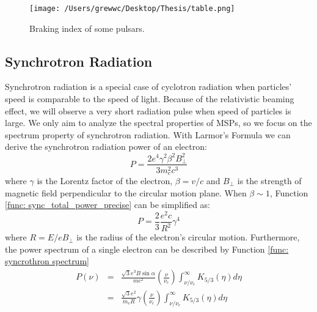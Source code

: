 \documentclass[12pt]{report}
\newcommand{\mycaption}[1]{\protect \caption{#1}}
\begin{document}
            
            \begin{figure}[!ht]
              \centering
              \texttt{[image: /Users/grewwc/Desktop/Thesis/table.png]}
              \mycaption{Braking index of some pulsars.}
              \label{fig:braking_index}
            \end{figure}
    
          \subsection{Synchrotron Radiation}
            Synchrotron radiation is a special case of cyclotron radiation when particles' speed is comparable to the 
            speed of light. Because of the relativistic beaming effect, we will observe a very short radiation pulse 
            when speed of particles is large. 
            We only aim to analyze the spectral properties of MSPs, so we focus on the 
            spectrum property of synchrotron radiation. 
            With Larmor's Formula we can derive the synchrotron radiation power of an electron:
            \begin{equation}
              \label{func: sync_total_power_precise}
              P = \frac{2e^4\gamma^2\beta^2B_{\perp}^2}{3m_e^2c^3} 
            \end{equation}
            where $\gamma$ is the Lorentz factor of the electron, $\beta=v/c$ and $B_{\perp}$ is the strength 
            of magnetic field perpendicular to the circular motion plane. 
            When $\beta \sim 1$, Function \ref{func: sync_total_power_precise} can be simplified as:
            \begin{equation}
              \label{func: sync_total_power_simplified}
              P = \frac{2}{3}\frac{e^2c}{R^2}\gamma^4
            \end{equation}
            where $R = E / e B_{\perp}$ is the radius of the electron's circular motion. 
            Furthermore, the power spectrum of a single electron  
            can be described by Function \ref{func: syncrothron spectrum}
            \begin{eqnarray}
              \label{func: syncrothron spectrum}
              P\left(\nu\right) &=& \frac{\sqrt{3} e^3 B \sin{\alpha}}{m c^2} 
                \left(\frac{\nu}{\nu_c}\right) \int_{\nu / \nu_c}^{\infty} K_{5/3}\left(\eta \right)d\eta  \nonumber \\
                &=& \frac{\sqrt{3}e^2}{m_eR}\gamma \left(\frac{\nu}{\nu_c}\right) \int_{\nu / \nu_c}^{\infty} K_{5/3}\left(\eta \right)d\eta
            \end{eqnarray}
\end{document}
